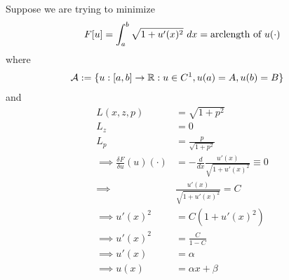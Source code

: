 \documentclass{article}
\begin{document}
	\begin{example}
		Suppose we are trying to minimize
		\begin{align}
			F[u] = \int_a^b \sqrt{1 + u'(x)^2}\ dx = \text{{arclength of }} u(\cdot)
		\end{align}
		where 
		\begin{align}
			\mathcal{{A}} &:=\{u:[a, b] \to \mathbb{R}:u \in C^1, u(a) = A, u(b) = B\}
		\end{align}
		and
		\begin{align}
			L(x, z, p) &= \sqrt{1 + p^2} \\
			L_z &= 0 \\
			L_p &= \frac{p}{\sqrt{1+p^2}} \\
			\implies \frac{\delta F}{\delta u}(u)(\cdot) 
			&= - \frac{d}{dx} \frac{u'(x)}{\sqrt{1+u'(x)^2}} \equiv 0 \\
			\implies & \frac{u'(x)}{\sqrt{1+u'(x)^2}} = C \\
			\implies u'(x)^2 &= C (1+u'(x)^2) \\
			\implies u'(x)^2 &= \frac{C}{1-C} \\
			\implies u'(x) &= \alpha \\
			\implies u(x) &= \alpha x + \beta
		\end{align}
	\end{example}
	
\end{document}
